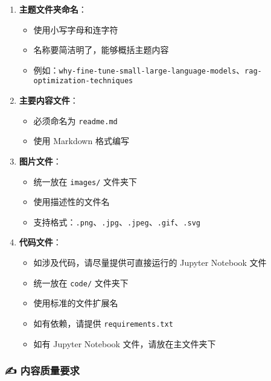 \documentclass[
]{article}
\providecommand{\tightlist}{%
  \setlength{\itemsep}{0pt}\setlength{\parskip}{0pt}}
\begin{document}
\begin{enumerate}
\def\labelenumi{\arabic{enumi}.}
\tightlist
\item
  \textbf{主题文件夹命名}：

  \begin{itemize}
  \tightlist
  \item
    使用小写字母和连字符
  \item
    名称要简洁明了，能够概括主题内容
  \item
    例如：\texttt{why-fine-tune-small-large-language-models}、\texttt{rag-optimization-techniques}
  \end{itemize}
\item
  \textbf{主要内容文件}：

  \begin{itemize}
  \tightlist
  \item
    必须命名为 \texttt{readme.md}
  \item
    使用 Markdown 格式编写
  \end{itemize}
\item
  \textbf{图片文件}：

  \begin{itemize}
  \tightlist
  \item
    统一放在 \texttt{images/} 文件夹下
  \item
    使用描述性的文件名
  \item
    支持格式：\texttt{.png}、\texttt{.jpg}、\texttt{.jpeg}、\texttt{.gif}、\texttt{.svg}
  \end{itemize}
\item
  \textbf{代码文件}：

  \begin{itemize}
  \tightlist
  \item
    如涉及代码，请尽量提供可直接运行的 Jupyter Notebook 文件
  \item
    统一放在 \texttt{code/} 文件夹下
  \item
    使用标准的文件扩展名
  \item
    如有依赖，请提供 \texttt{requirements.txt}
  \item
    如有 Jupyter Notebook 文件，请放在主文件夹下
  \end{itemize}
\end{enumerate}

\subsubsection{✍️
内容质量要求}\label{ux5185ux5bb9ux8d28ux91cfux8981ux6c42}
\end{document}
